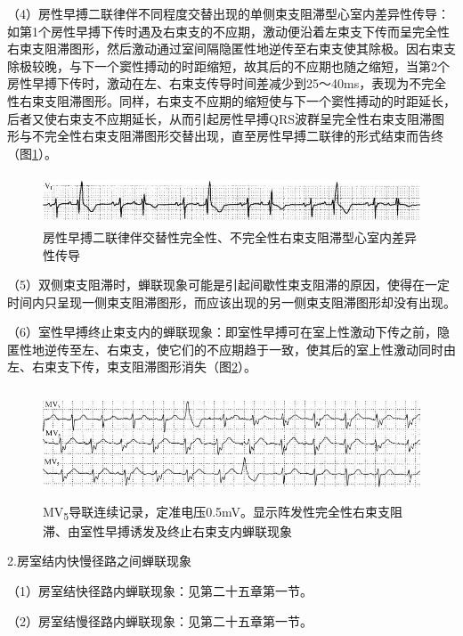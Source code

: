 （4）房性早搏二联律伴不同程度交替出现的单侧束支阻滞型心室内差异性传导：如第1个房性早搏下传时遇及右束支的不应期，激动便沿着左束支下传而呈完全性右束支阻滞图形，然后激动通过室间隔隐匿性地逆传至右束支使其除极。因右束支除极较晚，与下一个窦性搏动的时距缩短，故其后的不应期也随之缩短，当第2个房性早搏下传时，激动在左、右束支传导时间差减少到25～40ms，表现为不完全性右束支阻滞图形。同样，右束支不应期的缩短使与下一个窦性搏动的时距延长，后者又使右束支不应期延长，从而引起房性早搏QRS波群呈完全性右束支阻滞图形与不完全性右束支阻滞图形交替出现，直至房性早搏二联律的形式结束而告终（图\ref{fig35-6}）。

\begin{figure}[!htbp]
 \centering
 \includegraphics[width=5.58333in,height=0.58333in]{./images/Image00559.jpg}
 \captionsetup{justification=centering}
 \caption{房性早搏二联律伴交替性完全性、不完全性右束支阻滞型心室内差异性传导}
 \label{fig35-6}
  \end{figure} 

（5）双侧束支阻滞时，蝉联现象可能是引起间歇性束支阻滞的原因，使得在一定时间内只呈现一侧束支阻滞图形，而应该出现的另一侧束支阻滞图形却没有出现。

（6）室性早搏终止束支内的蝉联现象：即室性早搏可在室上性激动下传之前，隐匿性地逆传至左、右束支，使它们的不应期趋于一致，使其后的室上性激动同时由左、右束支下传，束支阻滞图形消失（图\ref{fig35-7}）。

\begin{figure}[!htbp]
 \centering
 \includegraphics[width=5.58333in,height=1.29167in]{./images/Image00560.jpg}
 \captionsetup{justification=centering}
 \caption{MV\textsubscript{5}导联连续记录，定准电压0.5mV。显示阵发性完全性右束支阻滞、由室性早搏诱发及终止右束支内蝉联现象}
 \label{fig35-7}
  \end{figure} 


2.房室结内快慢径路之间蝉联现象

（1）房室结快径路内蝉联现象：见第二十五章第一节。

（2）房室结慢径路内蝉联现象：见第二十五章第一节。

